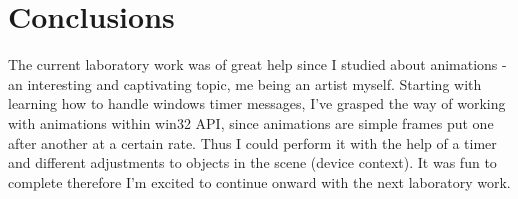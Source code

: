 \section*{Conclusions}

The current laboratory work was of great help since I studied about animations - an interesting and captivating topic, me being an artist myself.
Starting with learning how to handle windows timer messages, I've grasped the way of working with animations within win32 API, since animations are simple frames put one after another at a certain rate. Thus I could perform it with the help of a timer and different adjustments to objects in the scene (device context). It was fun to complete therefore I'm excited to continue onward with the next laboratory work.

\clearpage